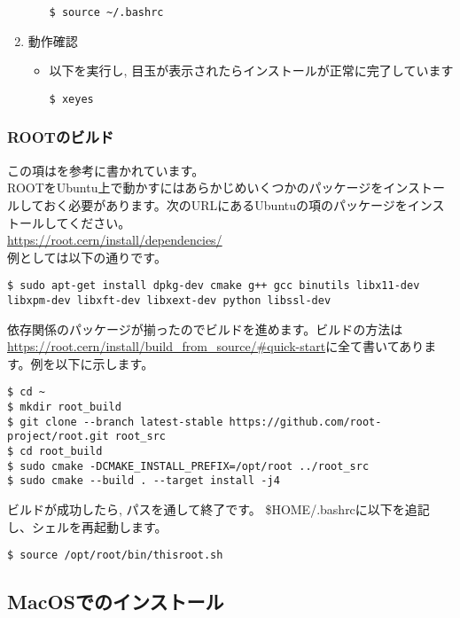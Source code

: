 \begin{enumerate}
\begin{itemize}
                \begin{lstlisting}
$ source ~/.bashrc
                \end{lstlisting}
        \end{itemize}
    \item 動作確認
        \begin{itemize}
            \item 以下を実行し, 目玉が表示されたらインストールが正常に完了しています
                \begin{lstlisting}
$ xeyes
                \end{lstlisting}
        \end{itemize}
\end{enumerate}

\subsubsection{ROOTのビルド}
この項は\url{}を参考に書かれています。\\
ROOTをUbuntu上で動かすにはあらかじめいくつかのパッケージをインストールしておく必要があります。次のURLにあるUbuntuの項のパッケージをインストールしてください。\\
\url{https://root.cern/install/dependencies/}\\
例としては以下の通りです。
\begin{lstlisting}
$ sudo apt-get install dpkg-dev cmake g++ gcc binutils libx11-dev libxpm-dev libxft-dev libxext-dev python libssl-dev
\end{lstlisting}
依存関係のパッケージが揃ったのでビルドを進めます。ビルドの方法は\url{https://root.cern/install/build_from_source/#quick-start}に全て書いてあります。例を以下に示します。
\begin{lstlisting}
$ cd ~
$ mkdir root_build
$ git clone --branch latest-stable https://github.com/root-project/root.git root_src
$ cd root_build
$ sudo cmake -DCMAKE_INSTALL_PREFIX=/opt/root ../root_src
$ sudo cmake --build . --target install -j4
\end{lstlisting}
ビルドが成功したら, パスを通して終了です。
\$HOME/.bashrcに以下を追記し、シェルを再起動します。
\begin{lstlisting}
$ source /opt/root/bin/thisroot.sh
\end{lstlisting}


\clearpage
\subsection{MacOSでのインストール}
